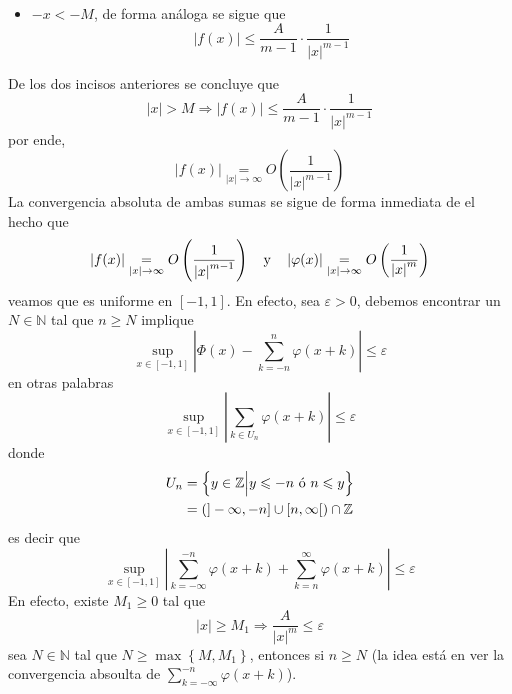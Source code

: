 \documentclass[12pt]{report}
\theoremstyle{largebreak}
\renewcommand{\leq}{\ensuremath{\leqslant}}
\renewcommand{\geq}{\ensuremath{\geqslant}}
\newcommand\abs[1]{\ensuremath{\left|#1\right|}}
\begin{document}
\begin{sol}
\begin{itemize}
\begin{equation*}
\begin{split}
                \end{split}
            \end{equation*}
            \item $-x<-M$, de forma análoga se sigue que
            \begin{equation*}
                \abs{f(x)}\leq \frac{A}{m-1}\cdot\frac{1}{\abs{x}^{m-1}}
            \end{equation*}
        \end{itemize}
        De los dos incisos anteriores se concluye que
        \begin{equation*}
            \abs{x}>M\Rightarrow \abs{f(x)}\leq \frac{A}{m-1}\cdot\frac{1}{\abs{x}^{m-1}}
        \end{equation*}
        por ende,
        \begin{equation*}
            \abs{f(x)}\underset{\abs{x}\rightarrow\infty}{=}O\left(\frac{1}{\abs{x}^{ m-1}} \right)
        \end{equation*}
        La convergencia absoluta de ambas sumas se sigue de forma inmediata de el hecho que
        \begin{equation*}
            \abs{f(x)}\underset{\abs{x}\rightarrow\infty}{=}O\left(\frac{1}{\abs{x}^{ m-1}} \right)\quad\textup{y}\quad\abs{\varphi(x)}\underset{\abs{x}\rightarrow\infty}{=}O\left(\frac{1}{\abs{x}^{ m}} \right)
        \end{equation*}
        veamos que es uniforme en $[-1,1]$. En efecto, sea $\varepsilon>0$, debemos encontrar un $N\in\mathbb{N}$ tal que $n\geq N$ implique
        \begin{equation*}
            \sup_{ x\in[-1,1]}\abs{\Phi(x)-\sum_{ k=-n}^{n}\varphi(x+k)}\leq\varepsilon
        \end{equation*}
        en otras palabras
        \begin{equation*}
            \sup_{ x\in[-1,1]}\abs{\sum_{ k\in U_n}\varphi(x+k)}\leq\varepsilon
        \end{equation*}
        donde
        \begin{equation*}
            \begin{split}
                U_n&=\left\{y\in\mathbb{Z}\Big|y\leq-n\textup{ ó }n\leq y \right\}\\
                &=\left(]-\infty,-n]\cup[n,\infty[\right)\cap\mathbb{Z}\\
            \end{split}
        \end{equation*}
        es decir que
        \begin{equation*}
            \sup_{ x\in[-1,1]}\abs{\sum_{ k=-\infty }^{ -n}\varphi(x+k)+\sum_{ k=n}^{\infty}\varphi(x+k)}\leq\varepsilon
        \end{equation*}
        En efecto, existe $M_1\geq 0$ tal que
        \begin{equation*}
            \abs{x}\geq M_1\Rightarrow \frac{A}{\abs{x}^m}\leq \varepsilon
        \end{equation*}
        sea $N\in\mathbb{N}$ tal que $N\geq\max\left\{M,M_1 \right\}$, entonces si $n\geq N$
        (la idea está en ver la convergencia absoulta de $\sum_{ k=-\infty }^{ -n}\varphi(x+k)$).


\end{sol}
\end{document}
